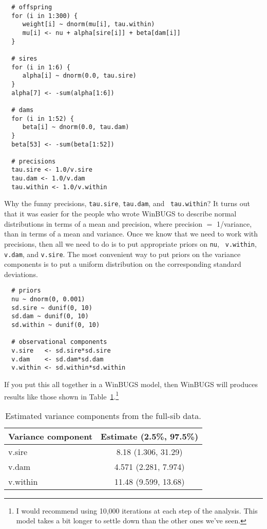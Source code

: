 \begin{verbatim}
  # offspring
  for (i in 1:300) {
     weight[i] ~ dnorm(mu[i], tau.within)
     mu[i] <- nu + alpha[sire[i]] + beta[dam[i]]
  }

  # sires
  for (i in 1:6) {
     alpha[i] ~ dnorm(0.0, tau.sire)
  }
  alpha[7] <- -sum(alpha[1:6])

  # dams
  for (i in 1:52) {
     beta[i] ~ dnorm(0.0, tau.dam)
  }
  beta[53] <- -sum(beta[1:52])

  # precisions
  tau.sire <- 1.0/v.sire
  tau.dam <- 1.0/v.dam
  tau.within <- 1.0/v.within
\end{verbatim}

Why the funny precisions, {\tt tau.sire}, {\tt tau.dam}, and {\tt
  tau.within}? It turns out that it was easier for the people who
wrote WinBUGS to describe normal distributions in terms of a mean and
precision, where precision $=$ 1/variance, than in terms of a mean and
variance. Once we know that we need to work with precisions, then all
we need to do is to put appropriate priors on {\tt nu}, {\tt
  v.within}, {\tt v.dam}, and {\tt v.sire}. The most convenient way to
put priors on the variance components is to put a uniform distribution
on the corresponding standard deviations.

\begin{verbatim}
  # priors
  nu ~ dnorm(0, 0.001)
  sd.sire ~ dunif(0, 10)
  sd.dam ~ dunif(0, 10)
  sd.within ~ dunif(0, 10)

  # observational components
  v.sire   <- sd.sire*sd.sire
  v.dam    <- sd.dam*sd.dam
  v.within <- sd.within*sd.within
\end{verbatim}

If you put this all together in a WinBUGS model, then
WinBUGS will produces results like those shown in
Table~\ref{table:results}.\footnote{I would recommend using 10,000
iterations at each step of the analysis. This model takes a bit
longer to settle down than the other ones we've seen.}

\begin{table}
\begin{center}
\begin{tabular}{lc}
\hline\hline
Variance component & Estimate (2.5\%, 97.5\%) \\
\hline
v.sire   & 8.18 (1.306, 31.29) \\
v.dam    & 4.571 (2.281, 7.974) \\
v.within & 11.48 (9.599, 13.68) \\
\hline
\end{tabular}
\end{center}
\caption{Estimated variance components from the full-sib
data.}\label{table:results}
\end{table}

